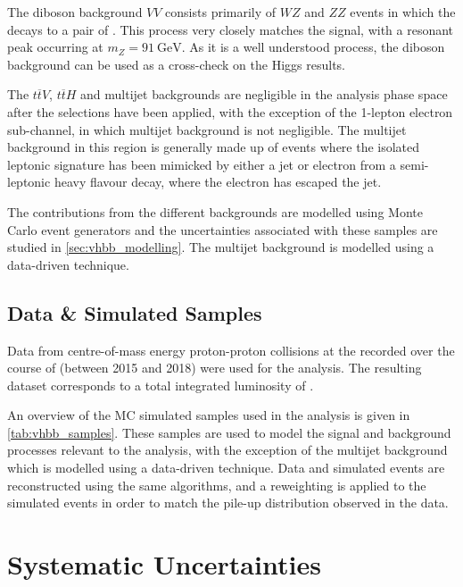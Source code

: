 The diboson background $VV$ consists primarily of $WZ$ and $ZZ$ events in which the \Zboson decays to a pair of \bquarks.
This process very closely matches the signal, with a resonant peak occurring at $m_Z = \SI{91}{\GeV}$.
As it is a well understood process, the diboson background can be used as a cross-check on the Higgs results.

The $t\overline{t} V$, $t\overline{t} H$ and multijet backgrounds are negligible in the analysis phase space after the selections have been applied, with the exception of the 1-lepton electron sub-channel, in which multijet background is not negligible.
The multijet background in this region is generally made up of events where the isolated leptonic signature has been mimicked by either a jet or electron from a semi-leptonic heavy flavour decay, where the electron has escaped the jet.

The contributions from the different backgrounds are modelled using Monte Carlo event generators and the uncertainties associated with these samples are studied in \cref{sec:vhbb_modelling}.
The multijet background is modelled using a data-driven technique.


\subsection{Data \& Simulated Samples}\label{sec:vhbb_samples}

Data from centre-of-mass energy  proton-proton collisions at the \LHC recorded over the course of \runtwo (between 2015 and
2018) were used for the analysis.
The resulting dataset corresponds to a total integrated luminosity of \intlumi.

An overview of the MC simulated samples used in the analysis is given in \cref{tab:vhbb_samples}.
These samples are used to model the signal and background processes relevant to the analysis, with the exception of the multijet background which is modelled using a data-driven technique.
Data and simulated events are reconstructed using the same algorithms, and a reweighting is applied to the simulated events in order to match the pile-up distribution
observed in the data.
%

%

\section{Systematic Uncertainties}\label{sec:systematic_uncertainties}



